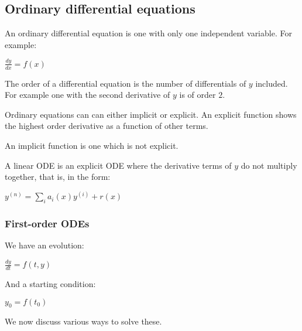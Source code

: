 
\subsection{Ordinary differential equations}

An ordinary differential equation is one with only one independent variable. For example:

\(\frac{dy}{dx}=f(x)\)

The order of a differential equation is the number of differentials of \(y\) included. For example one with the second derivative of \(y\) is of order \(2\).

Ordinary equations can can either implicit or explicit. An explicit function shows the highest order derivative as a function of other terms.

An implicit function is one which is not explicit.

A linear ODE is an explicit ODE where the derivative terms of \(y\) do not multiply together, that is, in the form:

\(y^{(n)}=\sum_ia_i(x)y^{(i)}+r(x)\)

\subsubsection{First-order ODEs}

We have an evolution:

\(\frac{dy}{dt}=f(t,y)\)

And a starting condition:

\(y_0=f(t_0)\)

We now discuss various ways to solve these.

